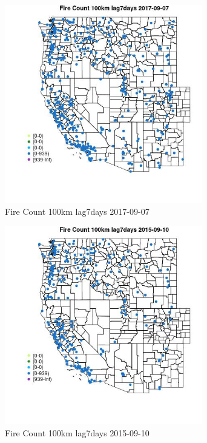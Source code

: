 \begin{figure} 
\centering  
\includegraphics[width=0.77\textwidth]{Code_Outputs/Report_ML_input_PM25_Step4_part_e_de_duplicated_aves_compiled_2019-05-21wNAs_MapObsFire_Count_100km_lag7days2017-09-07.jpg} 
\caption{\label{fig:Report_ML_input_PM25_Step4_part_e_de_duplicated_aves_compiled_2019-05-21wNAsMapObsFire_Count_100km_lag7days2017-09-07}Fire Count 100km lag7days 2017-09-07} 
\end{figure} 
 

\begin{figure} 
\centering  
\includegraphics[width=0.77\textwidth]{Code_Outputs/Report_ML_input_PM25_Step4_part_e_de_duplicated_aves_compiled_2019-05-21wNAs_MapObsFire_Count_100km_lag7days2015-09-10.jpg} 
\caption{\label{fig:Report_ML_input_PM25_Step4_part_e_de_duplicated_aves_compiled_2019-05-21wNAsMapObsFire_Count_100km_lag7days2015-09-10}Fire Count 100km lag7days 2015-09-10} 
\end{figure} 
 

